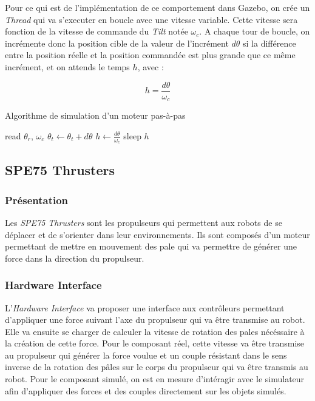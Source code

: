 				Pour ce qui est de l'implémentation de ce comportement dans \gls{Gazebo}, on crée un \textit{Thread} qui va s'executer en boucle avec une vitesse variable. Cette vitesse sera fonction de la vitesse de commande du \textit{Tilt} notée $\omega_c$. A chaque tour de boucle, on incrémente donc la position cible de la valeur de l'incrément $d\theta$ si la différence entre la position réelle et la position commandée est plus grande que ce même incrément, et on attends le temps $h$, avec :

				$$h = \frac{d\theta}{\omega_c}$$

				\begin{algorithm}[!htb]
					\caption{Algorithme de simulation d'un moteur pas-à-pas}
					\label{algo:stepper_motor}
					\begin{algorithmic}
							\STATE read $\theta_r$, $\omega_c$
								\STATE $\theta_t \leftarrow \theta_t + d\theta$
							\ENDIF
							\STATE $h \leftarrow \frac{d\theta}{\omega_c}$
							\STATE sleep $h$
						\ENDWHILE
					\end{algorithmic}
				\end{algorithm}

		\subsection{SPE75 Thrusters}

			\subsubsection{Présentation}
	
				Les \textit{SPE75 Thrusters} sont les propulseurs qui permettent aux robots de se déplacer et de s'orienter dans leur environnements. Ils sont composés d'un moteur permettant de mettre en mouvement des pale qui va permettre de générer une force dans la direction du propulseur.
				
			\subsubsection{Hardware Interface}

				L'\textit{Hardware Interface} va proposer une interface aux contrôleurs permettant d'appliquer une force suivant l'axe du propulseur qui va être transmise au robot. Elle va ensuite se charger de calculer la vitesse de rotation des pales nécéssaire à la création de cette force. Pour le composant réel, cette vitesse va être transmise au propulseur qui générer la force voulue et un couple résistant dans le sens inverse de la rotation des pâles sur le corps du propulseur qui va être transmis au robot. Pour le composant simulé, on est en mesure d'intéragir avec le simulateur afin d'appliquer des forces et des couples directement sur les objets simulés. 
				
